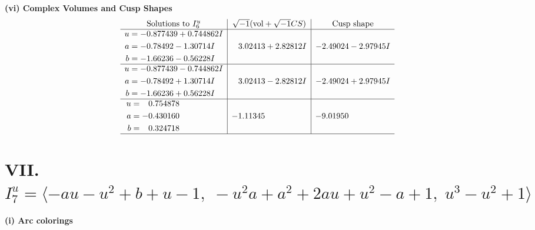 \documentclass[1p]{elsarticle_modified}
\theoremstyle{definition}
\newcommand{\I}{\sqrt{-1}}
\begin{document}
\newpage\flushleft \textbf{(vi) Complex Volumes and Cusp Shapes}
$$\begin{array}{c|c|c}  
\text{Solutions to }I^u_{6}& \I (\text{vol} + \sqrt{-1}CS) & \text{Cusp shape}\\
 \hline 
\begin{aligned}
u &= -0.877439 + 0.744862 I \\
a &= -0.78492 - 1.30714 I \\
b &= -1.66236 - 0.56228 I\end{aligned}
 & \phantom{-}3.02413 + 2.82812 I & -2.49024 - 2.97945 I \\ \hline\begin{aligned}
u &= -0.877439 - 0.744862 I \\
a &= -0.78492 + 1.30714 I \\
b &= -1.66236 + 0.56228 I\end{aligned}
 & \phantom{-}3.02413 - 2.82812 I & -2.49024 + 2.97945 I \\ \hline\begin{aligned}
u &= \phantom{-}0.754878\phantom{ +0.000000I} \\
a &= -0.430160\phantom{ +0.000000I} \\
b &= \phantom{-}0.324718\phantom{ +0.000000I}\end{aligned}
 & -1.11345\phantom{ +0.000000I} & -9.01950\phantom{ +0.000000I}\\
 \hline 
 \end{array}$$\newpage\newpage\renewcommand{\arraystretch}{1}
\centering \section*{VII. $I^u_{7}= \langle - a u- u^2+b+u-1,\;- u^2 a+a^2+2 a u+u^2- a+1,\;u^3- u^2+1 \rangle$}
\flushleft \textbf{(i) Arc colorings}\\
\end{document}

